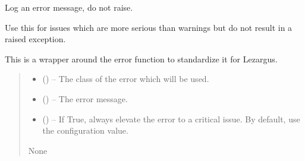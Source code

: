 \documentclass[letterpaper,11pt,english]{sphinxmanual}
\begin{document}
\begin{savenotes}\begin{fulllineitems}
\label{\detokenize{code/lezargus.library.logging:lezargus.library.logging.error}}
\pysigstartsignatures
{}
\pysigstopsignatures
\sphinxAtStartPar
Log an error message, do not raise.

\sphinxAtStartPar
Use this for issues which are more serious than warnings but do not result
in a raised exception.

\sphinxAtStartPar
This is a wrapper around the error function to standardize it for Lezargus.
\begin{quote}\begin{description}
\begin{itemize}
\item {} 
\sphinxAtStartPar
{} ({\hyperref[\detokenize{code/lezargus.library.logging:lezargus.library.logging.LezargusError}]{}}) – The class of the error which will be used.

\item {} 
\sphinxAtStartPar
{} () – The error message.

\item {} 
\sphinxAtStartPar
{} (\sphinxstyleliteralemphasis{\sphinxupquote{, }}) – If True, always elevate the error to a critical issue. By default,
use the configuration value.

\end{itemize}

\sphinxAtStartPar
None

\end{description}\end{quote}

\end{fulllineitems}\end{savenotes}
\end{document}
